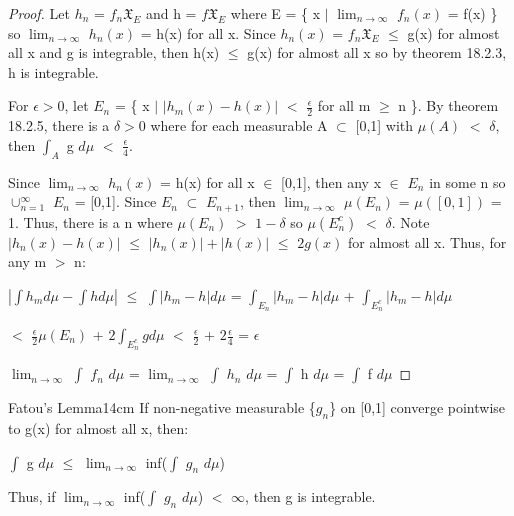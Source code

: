     \begin{proof}
        Let $h_n$ = $f_n \mathfrak{X}_E$ and h = $f \mathfrak{X}_E$
        where E = \{ x $|$ $\lim_{n \rightarrow \infty}$ $f_n(x)$ = f(x) \}
        so $\lim_{n \rightarrow \infty}$ $h_n(x)$ = h(x) for all x.
        Since $h_n(x)$ = $f_n \mathfrak{X}_E$ $\leq$ g(x) for almost all
        x and g is integrable, then h(x) $\leq$ g(x) for almost all x
        so by {\color{red} theorem 18.2.3}, h is integrable.

        For $\epsilon > 0$, let $E_n$ =
        \{ x $|$ $|h_m(x) - h(x)|$ $<$ $\frac{\epsilon}{2}$ for all m $\geq$ n \}.
        By {\color{red} theorem 18.2.5}, there is a $\delta > 0$
        where for each measurable A $\subset$ [0,1] with $\mu(A)$ $<$ $\delta$,
        then $\int_A$ g $d\mu$ $<$ $\frac{\epsilon}{4}$.

        Since $\lim_{n \rightarrow \infty}$ $h_n(x)$ = h(x) for all x $\in$ [0,1],
        then any x $\in$ $E_n$ in some n so $\cup_{n=1}^{\infty}$ $E_n$ = [0,1].
        Since $E_n$ $\subset$ $E_{n+1}$, then
        $\lim_{n \rightarrow \infty}$ $\mu(E_n)$ = $\mu([0,1])$ = 1.
        Thus, there is a n where $\mu(E_n)$ $>$ $1-\delta$
        so $\mu(E_n^c)$ $<$ $\delta$.
        Note $|h_n(x) - h(x)|$ $\leq$ $|h_n(x)| + |h(x)|$ $\leq$ $2g(x)$
        for almost all x. Thus, for any m $>$ n:

        \hspace{0.5cm}
        $|\int h_m d\mu - \int h d\mu|$
        $\leq$ $\int |h_m - h| d\mu$
        = $\int_{E_n} |h_m - h| d\mu$ + $\int_{E_n^c} |h_m - h| d\mu$
        
        \hspace{3.8cm}
        $<$ $\frac{\epsilon}{2} \mu(E_n)$ + $2 \int_{E_n^c} g d\mu$
        $<$ $\frac{\epsilon}{2}$ + $2 \frac{\epsilon}{4}$
        = $\epsilon$

        \hspace{0.5cm}
        $\lim_{n \rightarrow \infty}$ $\int$ $f_n$ $d\mu$
        = $\lim_{n \rightarrow \infty}$ $\int$ $h_n$ $d\mu$
        = $\int$ h $d\mu$
        = $\int$ f $d\mu$
    \end{proof}

    \newpage



    \begin{wtheorem}{Fatou's Lemma}{14cm}
        If non-negative measurable \{$g_n$\} on [0,1]
        converge pointwise to g(x) for almost all x, then:

        \hspace{0.5cm}
        $\int$ g $d\mu$
        $\leq$ $\lim_{n \rightarrow \infty}$ inf($\int$ $g_n$ $d\mu$)

        Thus, if $\lim_{n \rightarrow \infty}$ inf($\int$ $g_n$ $d\mu$)
        $<$ $\infty$, then g is integrable.
    \end{wtheorem}

